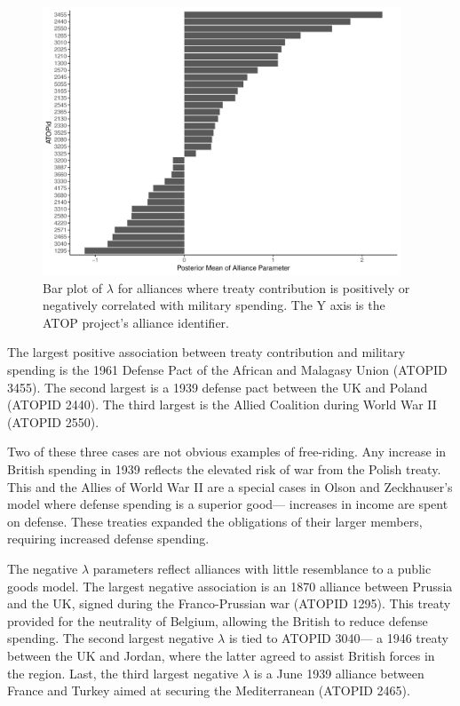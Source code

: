 \documentclass[12pt]{article}
\begin{document}
\begin{figure}
	\centering
		\includegraphics[width=0.95\textwidth]{nonzero-alliance-coefs.pdf}
	\caption{Bar plot of $\lambda$ for alliances where treaty contribution is positively or negatively correlated with military spending. The Y axis is the ATOP project's alliance identifier.}	
	\label{fig:nonzero-alliance-coefs}
\end{figure}


The largest positive association between treaty contribution and military spending is the 1961 Defense Pact of the African and Malagasy Union (ATOPID 3455). 
The second largest is a 1939 defense pact between the UK and Poland (ATOPID 2440). 
The third largest is the Allied Coalition during World War II (ATOPID 2550). 


Two of these three cases are not obvious examples of free-riding. 
Any increase in British spending in 1939 reflects the elevated risk of war from the Polish treaty.  
This and the Allies of World War II are a special cases in Olson and Zeckhauser's model where defense spending is a superior good--- increases in income are spent on defense. 
These treaties expanded the obligations of their larger members, requiring increased defense spending. 


The negative $\lambda$ parameters reflect alliances with little resemblance to a public goods model. 
The largest negative association is an 1870 alliance between Prussia and the UK, signed during the Franco-Prussian war (ATOPID 1295). 
This treaty provided for the neutrality of Belgium, allowing the British to reduce defense spending. 
The second largest negative $\lambda$ is tied to ATOPID 3040--- a 1946 treaty between the UK and Jordan, where the latter agreed to assist British forces in the region. 
Last, the third largest negative $\lambda$ is a June 1939 alliance between France and Turkey aimed at securing the Mediterranean (ATOPID 2465). 
\end{document}
